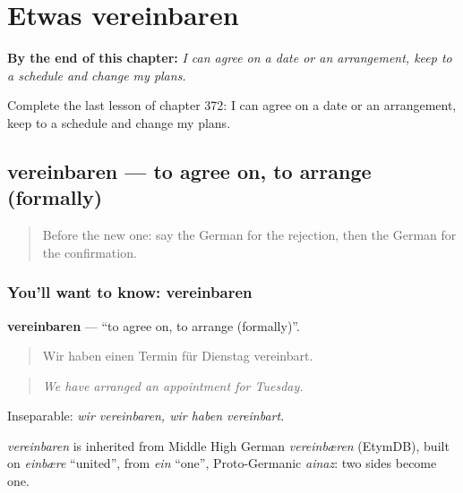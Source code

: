 
\chapter{Etwas vereinbaren}
\label{ch:ge-etwas-vereinbaren}

\begin{chapteropening}
\textbf{By the end of this chapter:} \emph{I can agree on a date or an arrangement, keep to a schedule and change my plans.}

Complete the last lesson of chapter 372: I can agree on a date or an arrangement, keep to a schedule and change my plans.
\end{chapteropening}

\section[vereinbaren]{vereinbaren — to agree on, to arrange (formally)}

\label{lesson:GE-C372-vereinbaren}



\begin{quote}
Before the new one: say the German for the rejection, then the German for the confirmation.
\end{quote}

\subsection*{You'll want to know: vereinbaren}
\textbf{vereinbaren} — \textquotedblleft{}to agree on, to arrange (formally)\textquotedblright{}.

\begin{quote}
Wir haben einen Termin für Dienstag vereinbart.
\end{quote}

\begin{quote}
\emph{We have arranged an appointment for Tuesday.}
\end{quote}

Inseparable: \emph{wir vereinbaren, wir haben vereinbart}.

\begin{cousinweb}
\emph{vereinbaren} is inherited from Middle High German \emph{vereinbæren} (EtymDB), built on \emph{einbære} \textquotedblleft{}united\textquotedblright{}, from \emph{ein} \textquotedblleft{}one\textquotedblright{}, Proto-Germanic \emph{ainaz}: two sides become one.
\end{cousinweb}

